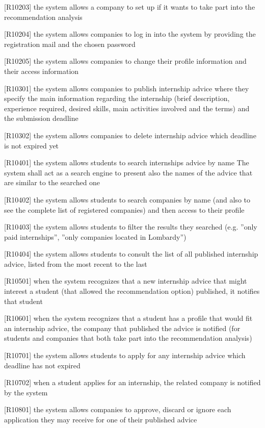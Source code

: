 		[R10203] the system allows a company to set up if it wants to take part into the recommendation analysis
		
		[R10204] the system allows companies to log in into the system by providing the registration mail and the chosen password
		
		[R10205] the system allows companies to change their profile information and their access information
		
		[R10301] the system allows companies to publish internship advice where they specify the main information regarding the internship (brief description, experience required, desired skills, main activities involved and the terms) and the submission deadline
		
		[R10302] the system allows companies to delete internship advice which deadline is not expired yet
		
		[R10401] the system allows students to search internships advice by name The system shall act as a search engine to present also the names of the advice that are similar to the searched one
		
		[R10402] the system allows students to search companies by name (and also to see the complete list of registered companies) and then access to their profile
		
		[R10403] the system allows students to filter the results they searched (e.g. ”only paid internships”, ”only companies located in Lombardy”)
		
		[R10404] the system allows students to consult the list of all published internship advice, listed from the most recent to the last
		
		[R10501] when the system recognizes that a new internship advice that might interest a student (that allowed the recommendation option) published, it notifies that student
		
		[R10601] when the system recognizes that a student has a profile that would fit an internship advice, the company that published the advice is notified (for students and companies that both take part into the recommendation analysis)
		
		[R10701] the system allows students to apply for any internship advice which deadline has not expired
		
		[R10702] when a student applies for an internship, the related company is notified by the system
		
		[R10801] the system allows companies to approve, discard or ignore each application they may receive for one of their published advice
		
